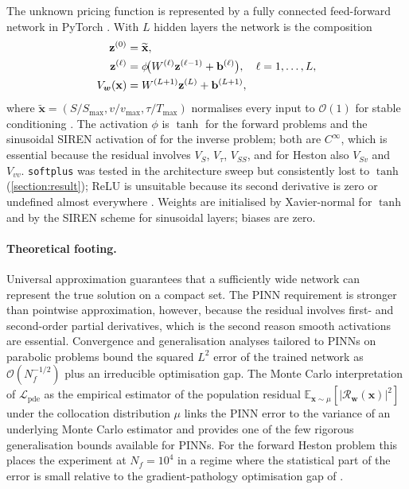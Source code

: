 The unknown pricing function is represented by a fully connected feed-forward network in PyTorch \parencite{paszke2019pytorch}. With $L$ hidden layers the network is the composition
\begin{align}\label{eq:network}
    \mathbf{z}^{(0)} &= \widetilde{\mathbf{x}},\notag\\
    \mathbf{z}^{(\ell)} &= \phi\!\big(W^{(\ell)}\mathbf{z}^{(\ell-1)}+\mathbf{b}^{(\ell)}\big),\quad \ell=1,\ldots,L,\notag\\
    V_{\boldsymbol{w}}(\mathbf{x}) &= W^{(L+1)}\mathbf{z}^{(L)}+\mathbf{b}^{(L+1)},
\end{align}
where $\widetilde{\mathbf{x}}=(S/S_{\max},v/v_{\max},\tau/T_{\max})$ normalises every input to $\mathcal{O}(1)$ for stable conditioning \parencite{glorot2010xavier,goodfellow2016deep}. The activation $\phi$ is $\tanh$ for the forward problems and the sinusoidal SIREN activation of \textcite{sitzmann2020siren} for the inverse problem; both are $C^{\infty}$, which is essential because the residual involves $V_S$, $V_\tau$, $V_{SS}$, and for Heston also $V_{Sv}$ and $V_{vv}$. \texttt{softplus} was tested in the architecture sweep but consistently lost to $\tanh$ (\cref{section:result}); ReLU is unsuitable because its second derivative is zero or undefined almost everywhere \parencite{cuomo2022scientific}. Weights are initialised by Xavier-normal \parencite{glorot2010xavier} for $\tanh$ and by the SIREN scheme \parencite{sitzmann2020siren} for sinusoidal layers; biases are zero.

\paragraph{Theoretical footing.} Universal approximation \parencite{cybenko1989approximation,hornik1989multilayer,pinkus1999approximation} guarantees that a sufficiently wide network can represent the true solution on a compact set. The PINN requirement is stronger than pointwise approximation, however, because the residual involves first- and second-order partial derivatives, which is the second reason smooth activations are essential. Convergence and generalisation analyses tailored to PINNs on parabolic problems \parencite{shin2020convergence,mishra2022estimates} bound the squared $L^2$ error of the trained network as $\mathcal{O}(N_f^{-1/2})$ plus an irreducible optimisation gap. The Monte Carlo interpretation of $\mathcal{L}_{\mathrm{pde}}$ as the empirical estimator of the population residual $\mathbb{E}_{\mathbf{x}\sim\mu}[|\mathcal{R}_{\boldsymbol{w}}(\mathbf{x})|^2]$ under the collocation distribution $\mu$ \parencite{raissi2019physics,sirignano2018dgm} links the PINN error to the variance of an underlying Monte Carlo estimator and provides one of the few rigorous generalisation bounds available for PINNs. For the forward Heston problem this places the experiment at $N_f=10^4$ in a regime where the statistical part of the error is small relative to the gradient-pathology optimisation gap of \textcite{wang2021understanding,wang2022expert,krishnapriyan2021characterizing}.

